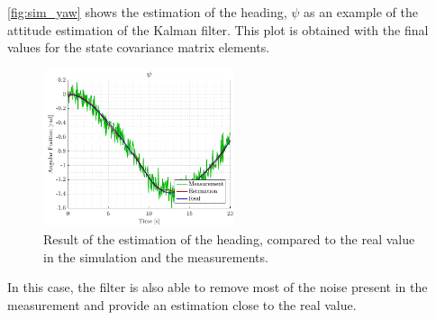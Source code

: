 \autoref{fig:sim_yaw} shows the estimation of the heading, $\psi$ as an example of the attitude estimation of the Kalman filter. This plot is obtained with the final values for the state covariance matrix elements.
\begin{figure}[H]
    \includegraphics[width=0.5\textwidth]{figures/sim_yaw}
    \caption{Result of the estimation of the heading, compared to the real value in the simulation and the measurements.}
    \label{fig:sim_yaw}
\end{figure}
In this case, the filter is also able to remove most of the noise present in the measurement and provide an estimation close to the real value. 
%

%
%
%
